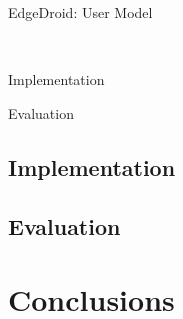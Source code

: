 \documentclass[aspectratio=1610]{beamer}
\begin{document}
\begin{frame}{EdgeDroid: User Model}
    \begin{center}
        \\
    \end{center}
\end{frame}

\begin{frame}{Implementation}

\end{frame}

\begin{frame}{Evaluation}

\end{frame}


\subsection{Implementation}
\subsection{Evaluation}
\section{Conclusions}
\end{document}
